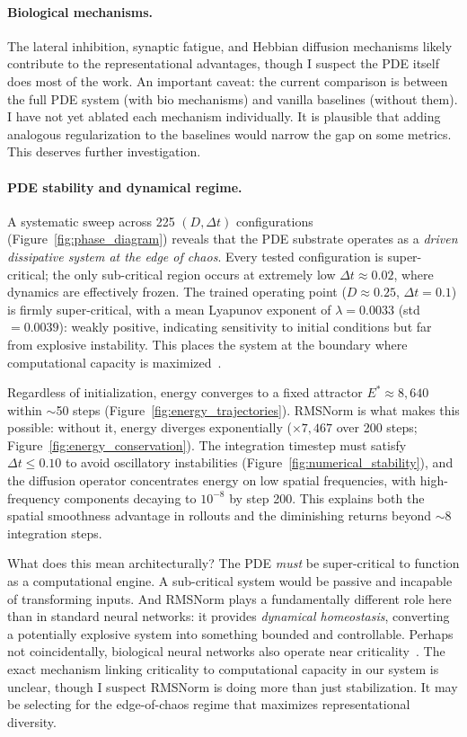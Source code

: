 \documentclass{article}
\begin{document}
\paragraph{Biological mechanisms.}
The lateral inhibition, synaptic fatigue, and Hebbian diffusion mechanisms likely contribute to the representational advantages, though I suspect the PDE itself does most of the work. An important caveat: the current comparison is between the full PDE system (with bio mechanisms) and vanilla baselines (without them). I have not yet ablated each mechanism individually. It is plausible that adding analogous regularization to the baselines would narrow the gap on some metrics. This deserves further investigation.

\paragraph{PDE stability and dynamical regime.}
A systematic sweep across 225 $(D, \Delta t)$ configurations (Figure~\ref{fig:phase_diagram}) reveals that the PDE substrate operates as a \emph{driven dissipative system at the edge of chaos}. Every tested configuration is super-critical; the only sub-critical region occurs at extremely low $\Delta t \approx 0.02$, where dynamics are effectively frozen. The trained operating point ($D \approx 0.25$, $\Delta t = 0.1$) is firmly super-critical, with a mean Lyapunov exponent of $\lambda = 0.0033$ (std $= 0.0039$): weakly positive, indicating sensitivity to initial conditions but far from explosive instability. This places the system at the boundary where computational capacity is maximized~\cite{langton1990computation}.

Regardless of initialization, energy converges to a fixed attractor $E^* \approx 8{,}640$ within $\sim$50 steps (Figure~\ref{fig:energy_trajectories}). RMSNorm is what makes this possible: without it, energy diverges exponentially ($\times 7{,}467$ over 200 steps; Figure~\ref{fig:energy_conservation}). The integration timestep must satisfy $\Delta t \leq 0.10$ to avoid oscillatory instabilities (Figure~\ref{fig:numerical_stability}), and the diffusion operator concentrates energy on low spatial frequencies, with high-frequency components decaying to $10^{-8}$ by step 200. This explains both the spatial smoothness advantage in rollouts and the diminishing returns beyond $\sim$8 integration steps.

What does this mean architecturally? The PDE \emph{must} be super-critical to function as a computational engine. A sub-critical system would be passive and incapable of transforming inputs. And RMSNorm plays a fundamentally different role here than in standard neural networks: it provides \emph{dynamical homeostasis}, converting a potentially explosive system into something bounded and controllable. Perhaps not coincidentally, biological neural networks also operate near criticality~\cite{beggs2003neuronal}. The exact mechanism linking criticality to computational capacity in our system is unclear, though I suspect RMSNorm is doing more than just stabilization. It may be selecting for the edge-of-chaos regime that maximizes representational diversity.
\end{document}
